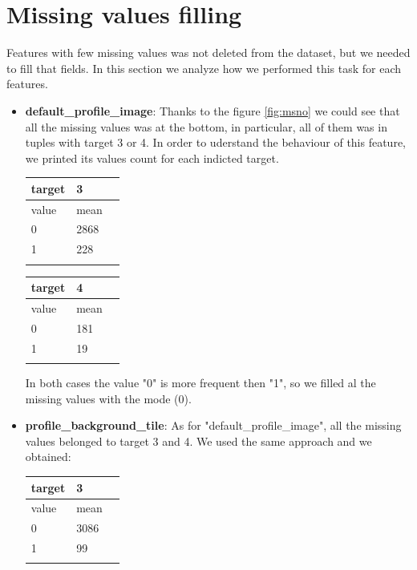 \section{Missing values filling}
Features with few missing values was not deleted from the dataset, but we needed to fill that fields.
In this section we analyze how we performed this task for each features.
\begin{itemize}
	\item[\PencilRight]\textbf{default\_profile\_image}: Thanks to the figure \ref{fig:msno} we could see that all the missing values was at the bottom, in particular, all of them was in tuples with target 3 or 4. In order to uderstand the behaviour of this feature, we printed its values count for each indicted target.
	\begin{center}
		\begin{tabular}{lll}
			\\target&3\\
			\hline\hline
			value&mean\\
			\hline\hline
			0&2868\\
			1&228\\\hline\\
		\end{tabular}
		
		\begin{tabular}{lll}
			\\target&4\\
			\hline\hline
			value&mean\\
			\hline\hline
			0&181\\
			1&19\\\hline\\
		\end{tabular}
	\end{center}
	
	In both cases the value "0" is more frequent then "1", so we filled al the missing values with the mode (0).
	
	\item[\PencilRight]\textbf{profile\_background\_tile}: As for "default\_profile\_image", all the missing values belonged to target 3 and 4. We used the same approach and we obtained:
	\begin{center}
		\begin{tabular}{lll}
			\\target&3\\
			\hline\hline
			value&mean\\
			\hline\hline
			0&3086\\
			1&99\\\hline\\
		\end{tabular}
		

\end{center}
\end{itemize}

